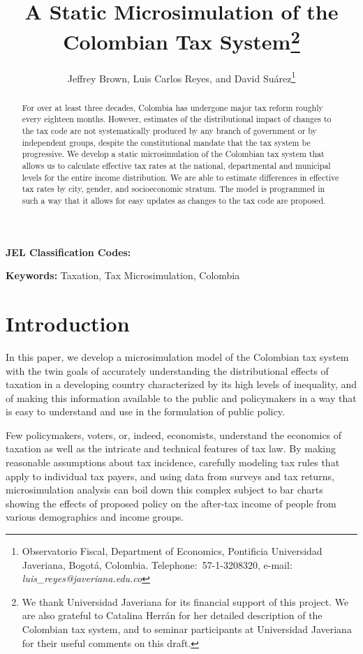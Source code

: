 \documentclass[12pt]{article}
\begin{document}
\title{A Static Microsimulation of the Colombian Tax System\thanks{We thank Universidad Javeriana for its financial support of this project. We are also grateful to Catalina Herr\'{a}n for her detailed description of the Colombian tax system, and to seminar participants at Universidad Javeriana for their useful comments on this draft.}}
\author{Jeffrey Brown, Luis Carlos Reyes, and David Su\'{a}rez\thanks{Observatorio Fiscal, Department of Economics, Pontificia Universidad Javeriana, Bogot\'{a}, Colombia. Telephone:\ 57-1-3208320, e-mail: \textit{luis\_reyes@javeriana.edu.co}}}

\maketitle
\begin{abstract}
  For over at least three decades, Colombia has undergone major tax reform roughly every eighteen months.
  However, estimates of the distributional impact of changes to the tax code are not systematically produced by any branch of government or by independent groups, despite the constitutional mandate that the tax system be progressive.
  We develop a static microsimulation of the Colombian tax system that allows us to calculate effective tax rates at the national, departmental and municipal levels for the entire income distribution.
  We are able to estimate differences in effective tax rates by city, gender, and socioeconomic stratum.
  The model is programmed in such a way that it allows for easy updates as changes to the tax code are proposed.
 \end{abstract}

\textbf{JEL Classification Codes:}

\textbf{Keywords:} Taxation, Tax Microsimulation, Colombia
\pagebreak%
\doublespacing

\section{Introduction}

In this paper, we develop a microsimulation model of the Colombian tax system with the twin goals of accurately understanding the distributional effects of taxation in a developing country characterized by its high levels of inequality, and of making this information available to the public and policymakers in a way that is easy to understand and use in the formulation of public policy.

Few policymakers, voters, or, indeed, economists, understand the economics of taxation as well as the intricate and technical features of tax law.
By making reasonable assumptions about tax incidence, carefully modeling tax rules that apply to individual tax payers, and using data from surveys and tax returns, microsimulation analysis can boil down this complex subject to bar charts showing the effects of proposed policy on the after-tax income of people from various demographics and income groups.
\end{document}
